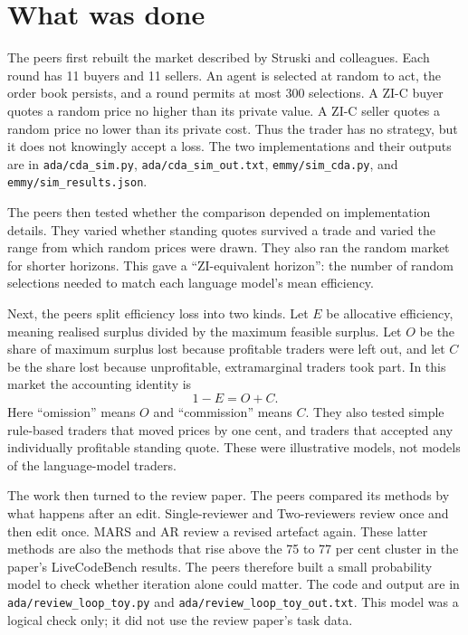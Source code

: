 \documentclass{article}
\begin{document}
\section{What was done}

The peers first rebuilt the market described by Struski and colleagues. Each round has 11 buyers and 11 sellers. An agent is selected at random to act, the order book persists, and a round permits at most 300 selections. A ZI-C buyer quotes a random price no higher than its private value. A ZI-C seller quotes a random price no lower than its private cost. Thus the trader has no strategy, but it does not knowingly accept a loss. The two implementations and their outputs are in \texttt{ada/cda\_sim.py}, \texttt{ada/cda\_sim\_out.txt}, \texttt{emmy/sim\_cda.py}, and \texttt{emmy/sim\_results.json}.

The peers then tested whether the comparison depended on implementation details. They varied whether standing quotes survived a trade and varied the range from which random prices were drawn. They also ran the random market for shorter horizons. This gave a ``ZI-equivalent horizon'': the number of random selections needed to match each language model's mean efficiency.

Next, the peers split efficiency loss into two kinds. Let $E$ be allocative efficiency, meaning realised surplus divided by the maximum feasible surplus. Let $O$ be the share of maximum surplus lost because profitable traders were left out, and let $C$ be the share lost because unprofitable, extramarginal traders took part. In this market the accounting identity is
\begin{equation}
1-E=O+C.
\end{equation}
Here ``omission'' means $O$ and ``commission'' means $C$. They also tested simple rule-based traders that moved prices by one cent, and traders that accepted any individually profitable standing quote. These were illustrative models, not models of the language-model traders.

The work then turned to the review paper. The peers compared its methods by what happens after an edit. Single-reviewer and Two-reviewers review once and then edit once. MARS and AR review a revised artefact again. These latter methods are also the methods that rise above the 75 to 77 per cent cluster in the paper's LiveCodeBench results. The peers therefore built a small probability model to check whether iteration alone could matter. The code and output are in \texttt{ada/review\_loop\_toy.py} and \texttt{ada/review\_loop\_toy\_out.txt}. This model was a logical check only; it did not use the review paper's task data.
\end{document}
